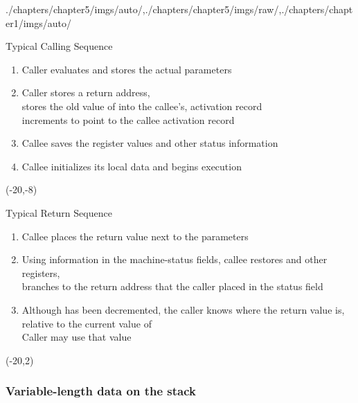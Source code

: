 \begin{graphicspathcontext}{{./chapters/chapter5/imgs/auto/},{./chapters/chapter5/imgs/raw/},{./chapters/chapter1/imgs/auto/}}
\begin{bibunit}[apalike]
\begin{frame}[background=6]{Typical Calling Sequence}
	\begin{enumerate}
		\item Caller evaluates and stores the actual parameters
		\item Caller stores a return address, \\
		stores the old value of  into the callee's, activation record \\
		increments  to point to the callee activation record
		\item Callee saves the register values and other status information
		\item Callee initializes its local data and begins execution
	\end{enumerate}
	\putat(-20,-8){}
\end{frame}

\begin{frame}[background=6]{Typical Return Sequence}
	\begin{enumerate}
		\item Callee places the return value next to the parameters
		\item Using information in the machine-status fields, callee restores  and other registers, \\
		branches to the return address that the caller placed in the status field
		\item Although  has been decremented, the caller knows where the return value is, relative to the current value of  \\
		Caller may use that value
	\end{enumerate}
	\putat(-20,2){}
\end{frame}

\subsubsection{Variable-length data on the stack}
\subsubsectiontableofcontentslide


\end{bibunit}
\end{graphicspathcontext}
